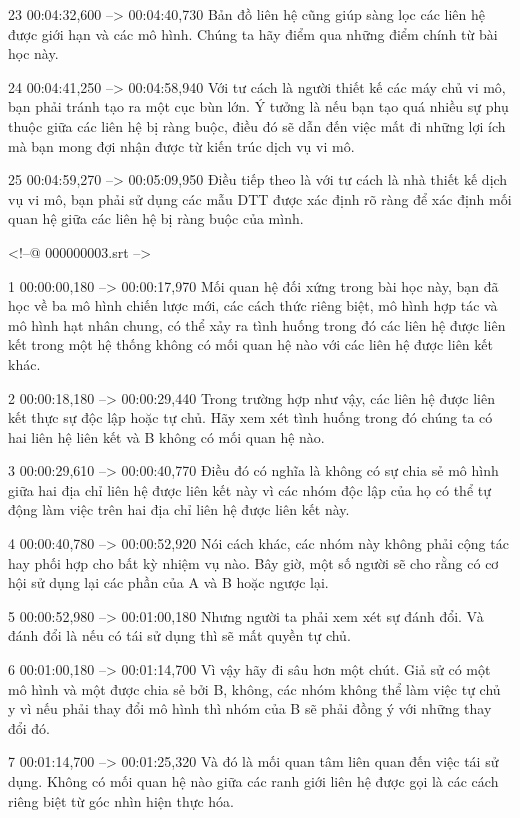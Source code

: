 23
00:04:32,600 --> 00:04:40,730
Bản đồ liên hệ cũng giúp sàng lọc các liên hệ được giới hạn và các mô hình.  Chúng ta hãy điểm qua những điểm chính từ bài học này.

24
00:04:41,250 --> 00:04:58,940
Với tư cách là người thiết kế các máy chủ vi mô, bạn phải tránh tạo ra một cục bùn lớn.  Ý tưởng là nếu bạn tạo quá nhiều sự phụ thuộc giữa các liên hệ bị ràng buộc, điều đó sẽ dẫn đến việc mất đi những lợi ích mà bạn mong đợi nhận được từ kiến ​​trúc dịch vụ vi mô.

25
00:04:59,270 --> 00:05:09,950
Điều tiếp theo là với tư cách là nhà thiết kế dịch vụ vi mô, bạn phải sử dụng các mẫu DTT được xác định rõ ràng để xác định mối quan hệ giữa các liên hệ bị ràng buộc của mình.

<!--@ 000000003.srt -->

1
00:00:00,180 --> 00:00:17,970
Mối quan hệ đối xứng trong bài học này, bạn đã học về ba mô hình chiến lược mới, các cách thức riêng biệt, mô hình hợp tác và mô hình hạt nhân chung, có thể xảy ra tình huống trong đó các liên hệ được liên kết trong một hệ thống không có mối quan hệ nào với các liên hệ được liên kết khác.

2
00:00:18,180 --> 00:00:29,440
Trong trường hợp như vậy, các liên hệ được liên kết thực sự độc lập hoặc tự chủ.  Hãy xem xét tình huống trong đó chúng ta có hai liên hệ liên kết và B không có mối quan hệ nào.

3
00:00:29,610 --> 00:00:40,770
Điều đó có nghĩa là không có sự chia sẻ mô hình giữa hai địa chỉ liên hệ được liên kết này vì các nhóm độc lập của họ có thể tự động làm việc trên hai địa chỉ liên hệ được liên kết này.

4
00:00:40,780 --> 00:00:52,920
Nói cách khác, các nhóm này không phải cộng tác hay phối hợp cho bất kỳ nhiệm vụ nào.  Bây giờ, một số người sẽ cho rằng có cơ hội sử dụng lại các phần của A và B hoặc ngược lại.

5
00:00:52,980 --> 00:01:00,180
Nhưng người ta phải xem xét sự đánh đổi.  Và đánh đổi là nếu có tái sử dụng thì sẽ mất quyền tự chủ.

6
00:01:00,180 --> 00:01:14,700
Vì vậy hãy đi sâu hơn một chút.  Giả sử có một mô hình và một được chia sẻ bởi B, không, các nhóm không thể làm việc tự chủ y vì nếu phải thay đổi mô hình thì nhóm của B sẽ phải đồng ý với những thay đổi đó.

7
00:01:14,700 --> 00:01:25,320
Và đó là mối quan tâm liên quan đến việc tái sử dụng.  Không có mối quan hệ nào giữa các ranh giới liên hệ được gọi là các cách riêng biệt từ góc nhìn hiện thực hóa.

